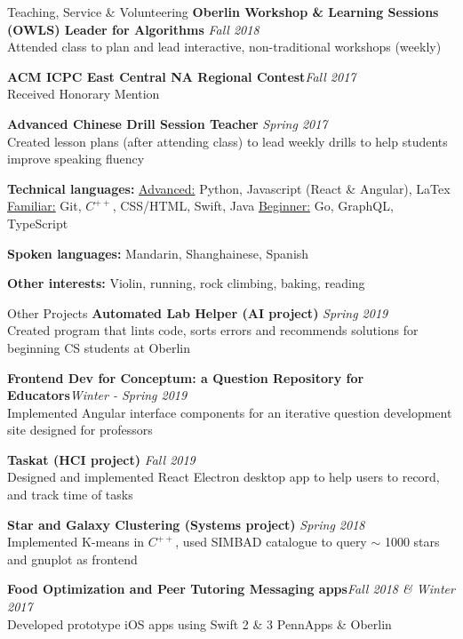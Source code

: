 \documentclass{resume}
\begin{document}
\begin{rSection}{Teaching, Service \& Volunteering}
{\bf Oberlin Workshop \& Learning Sessions (OWLS) Leader for Algorithms} \hfill {\em Fall 2018} \\
{ Attended class to plan and lead interactive, non-traditional workshops (weekly)} 

{\bf ACM ICPC East Central NA Regional Contest}\hfill{\em Fall 2017} \\
{Received Honorary Mention} 

{\bf Advanced Chinese Drill Session Teacher} \hfill {\em Spring 2017} \\
{ Created lesson plans (after attending class) to lead weekly drills to help students improve speaking fluency}

\textbf{Technical languages:} \hspace{11em} {\underline{Advanced:} Python, Javascript (React \& Angular), LaTex} \\
{\underline{Familiar:} Git, {$C^{++}$}, CSS/HTML, Swift, Java} \hspace{11em} {\underline{Beginner:} Go, GraphQL, TypeScript} 

\textbf{Spoken languages: }{Mandarin, Shanghainese, Spanish} 

{\bf Other interests: }{Violin, running, rock climbing, baking, reading}
\end{rSection}

\begin{rSection} {Other Projects}
{\bf Automated Lab Helper (AI project)
}\hfill  {\em Spring 2019} \\
Created program that lints code, sorts errors and recommends solutions for beginning CS students at Oberlin

{\bf Frontend Dev for Conceptum: a Question Repository for Educators}\hfill  {\em Winter - Spring 2019} \\
Implemented Angular interface components for an iterative question development site designed for professors

{\bf Taskat (HCI project)
}\hfill  {\em Fall 2019} \\
Designed and implemented {React} Electron desktop app to help users to record, and track time of tasks

{\bf Star and Galaxy Clustering (Systems project)
}\hfill {\em Spring 2018} \\
{Implemented K-means in {$C^{++}$}, used SIMBAD catalogue to query $\sim$ 1000 stars and gnuplot as frontend}

\textbf{Food Optimization and Peer Tutoring Messaging apps}\hfill {\em Fall 2018 \& Winter 2017} \\
{ Developed prototype iOS apps using Swift 2 \& 3} \hfill { PennApps \& Oberlin}
\end{rSection}
\end{document}
